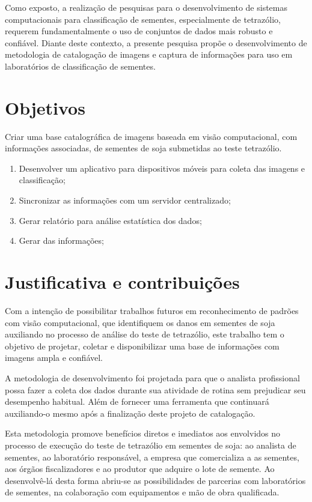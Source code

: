 Como exposto, a realização de pesquisas para o desenvolvimento de sistemas computacionais para classificação de sementes, especialmente de tetrazólio, requerem fundamentalmente o uso de conjuntos de dados mais robusto e confiável. 
Diante deste contexto, a presente pesquisa propõe o desenvolvimento de metodologia de catalogação de imagens e captura de informações  para uso em laboratórios de classificação de sementes.


\section{Objetivos}

Criar uma base catalográfica de imagens baseada em visão computacional, com informações associadas, de sementes de soja submetidas ao teste tetrazólio.


\begin{enumerate}
	\item Desenvolver um aplicativo para dispositivos móveis para coleta das imagens e classificação;
	\item Sincronizar as informações com um servidor centralizado;
	\item Gerar relatório para análise estatística dos dados;
	\item Gerar  das informações;
\end{enumerate}

\section{Justificativa e contribuições}

Com a intenção de possibilitar trabalhos futuros em reconhecimento de padrões com visão computacional, que identifiquem os danos em sementes de soja auxiliando no processo de análise do teste de tetrazólio, este trabalho tem o objetivo de projetar, coletar e disponibilizar uma base de informações com imagens ampla e confiável.

A metodologia de desenvolvimento foi projetada para que o analista profissional possa fazer a coleta dos dados durante sua atividade de rotina sem prejudicar seu desempenho habitual. Além de fornecer uma ferramenta que continuará auxiliando-o mesmo após a finalização deste projeto de catalogação.

Esta metodologia promove benefícios diretos e imediatos aos envolvidos no processo de execução do teste de tetrazólio em sementes de soja: ao analista de sementes, ao laboratório responsável, a empresa que comercializa a as sementes, aos órgãos fiscalizadores e ao produtor que adquire o lote de semente. Ao desenvolvê-lá desta forma abriu-se as possibilidades de parcerias com laboratórios de sementes, na colaboração com equipamentos e mão de obra qualificada.







